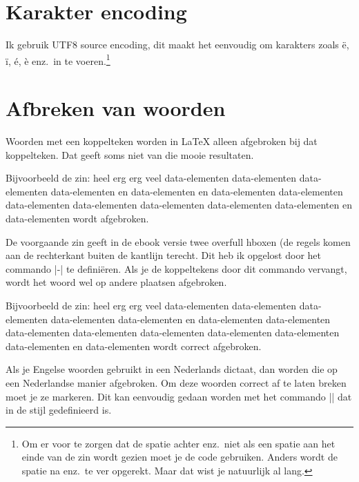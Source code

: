  \section{Karakter encoding}
 \label{sec:karakterencoding}
Ik gebruik UTF8 source encoding, dit maakt het eenvoudig om karakters zoals ë, ï, é, è enz.\ in te voeren.\footnote{%
    Om er voor te zorgen dat de spatie achter enz.\ niet als een spatie aan het einde van de zin wordt gezien moet je de code  gebruiken.
    Anders wordt de spatie na enz.\ te ver opgerekt.
    Maar dat wist je natuurlijk al lang.
}

\section{Afbreken van woorden}
Woorden met een koppelteken worden in \LaTeX{} alleen afgebroken bij dat koppelteken.
Dat geeft soms niet van die mooie resultaten.

Bijvoorbeeld de zin: heel erg erg veel data-elementen data-elementen data-elementen data-elementen en data-elementen en data-elementen data-elementen
data-elementen data-elementen data-elementen data-elementen data-elementen en data-elementen wordt  afgebroken.

De voorgaande zin geeft in de ebook versie twee overfull hboxen (de regels komen aan de rechterkant buiten de kantlijn terecht.
Dit heb ik opgelost door het commando |\hyp{}| te definiëren.
Als je de koppeltekens door dit commando vervangt, wordt het woord wel op andere plaatsen afgebroken.

Bijvoorbeeld de zin: heel erg erg veel data\hyp{}elementen data\hyp{}elementen data\hyp{}elementen data\hyp{}elementen data\hyp{}elementen en 
data\hyp{}elementen data\hyp{}elementen data\hyp{}elementen data\hyp{}elementen data\hyp{}elementen data\hyp{}elementen data\hyp{}elementen 
data\hyp{}elementen en data\hyp{}elementen wordt correct afgebroken.

Als je Engelse woorden gebruikt in een Nederlands dictaat, dan worden die op een Nederlandse manier afgebroken.
Om deze woorden correct af te laten breken moet je ze markeren.
Dit kan eenvoudig gedaan worden met het  commando |\USE| dat in de stijl gedefinieerd is.

